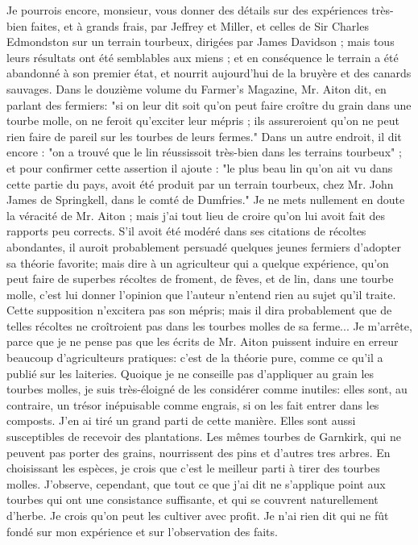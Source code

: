 Je pourrois encore, monsieur, vous donner des détails sur des expériences très-bien faites, et à grands frais, par Jeffrey et Miller, et celles de Sir Charles Edmondston sur un terrain tourbeux, dirigées par James Davidson ; mais tous leurs résultats ont été semblables aux miens ; et en conséquence le terrain a été abandonné à son premier état, et nourrit aujourd'hui de la bruyère et des canards sauvages. Dans le douzième volume du Farmer's Magazine, Mr. Aiton dit, en parlant des fermiers: "si on leur dit soit qu'on peut faire croître du grain dans une tourbe molle, on ne feroit qu'exciter leur mépris ; ils assureroient qu'on ne peut rien faire de pareil sur les tourbes de leurs fermes." Dans un autre endroit, il dit encore : "on a trouvé que le lin réussissoit très-bien dans les terrains tourbeux" ; et pour confirmer cette assertion il ajoute : "le plus beau lin qu'on ait vu dans cette partie du pays, avoit été produit par un terrain tourbeux, chez Mr. John James de Springkell, dans le comté de Dumfries." Je ne mets nullement en doute la véracité de Mr. Aiton ;\setcounter{page}{461} mais j'ai tout lieu de croire qu'on lui avoit fait des rapports peu corrects. S'il avoit été modéré dans ses citations de récoltes abondantes, il auroit probablement persuadé quelques jeunes fermiers d'adopter sa théorie favorite; mais dire à un agriculteur qui a quelque expérience, qu'on peut faire de superbes récoltes de froment, de fèves, et de lin, dans une tourbe molle, c'est lui donner l'opinion que l'auteur n'entend rien au sujet qu'il traite. Cette supposition n'excitera pas son mépris; mais il dira probablement que de telles récoltes ne croîtroient pas dans les tourbes molles de sa ferme... Je m'arrête, parce que je ne pense pas que les écrits de Mr. Aiton puissent induire en erreur beaucoup d'agriculteurs pratiques: c'est de la théorie pure, comme ce qu'il a publié sur les laiteries.
Quoique je ne conseille pas d'appliquer au grain les tourbes molles, je suis très-éloigné de les considérer comme inutiles: elles sont, au contraire, un trésor inépuisable comme engrais, si on les fait entrer dans les composts. J'en ai tiré un grand parti de cette manière. Elles sont aussi susceptibles de recevoir des plantations. Les mêmes tourbes de Garnkirk, qui ne peuvent pas porter des grains, nourrissent des pins et d'autres\setcounter{page}{462} tres arbres. En choisissant les espèces, je crois que c'est le meilleur parti à tirer des tourbes molles. J'observe, cependant, que tout ce que j'ai dit ne s'applique point aux tourbes qui ont une consistance suffisante, et qui se couvrent naturellement d'herbe. Je crois qu'on peut les cultiver avec profit. Je n'ai rien dit qui ne fût fondé sur mon expérience et sur l'observation des faits.
